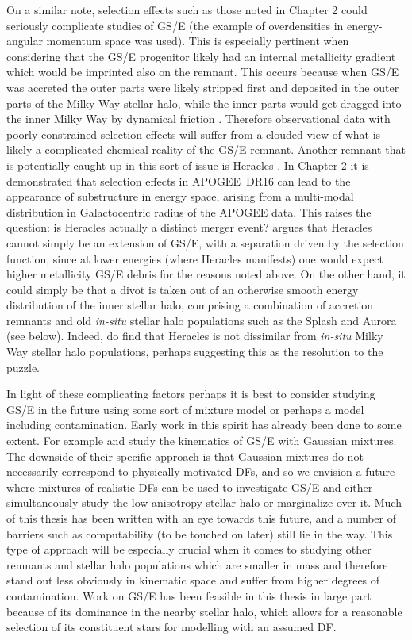 On a similar note, selection effects such as those noted in Chapter 2 could seriously complicate studies of GS/E (the example of overdensities in energy-angular momentum space was used). This is especially pertinent when considering that the GS/E progenitor likely had an internal metallicity gradient which would be imprinted also on the remnant. This occurs because when GS/E was accreted the outer parts were likely stripped first and deposited in the outer parts of the Milky Way stellar halo, while the inner parts would get dragged into the inner Milky Way by dynamical friction \parencite[e.g. see ][]{amarante22,vasiliev22}. Therefore observational data with poorly constrained selection effects will suffer from a clouded view of what is likely a complicated chemical reality of the GS/E remnant. Another remnant that is potentially caught up in this sort of issue is Heracles \parencite{horta21a}. In Chapter 2 it is demonstrated that selection effects in APOGEE~DR16 can lead to the appearance of substructure in energy space, arising from a multi-modal distribution in Galactocentric radius of the APOGEE data. This raises the question: is Heracles actually a distinct merger event? \textcite{amarante22} argues that Heracles cannot simply be an extension of GS/E, with a separation driven by the selection function, since at lower energies (where Heracles manifests) one would expect higher metallicity GS/E debris for the reasons noted above. On the other hand, it could simply be that a divot is taken out  of an otherwise smooth energy distribution of the inner stellar halo, comprising a combination of accretion remnants and old \textit{in-situ} stellar halo populations such as the Splash and Aurora (see below). Indeed, \textcite{horta23a} do find that Heracles is not dissimilar from \textit{in-situ} Milky Way stellar halo populations, perhaps suggesting this as the resolution to the puzzle.

In light of these complicating factors perhaps it is best to consider studying GS/E in the future using some sort of mixture model or perhaps a model including contamination. Early work in this spirit has already been done to some extent. For example \textcite{lancaster19} and \textcite{iorio21} study the kinematics of GS/E with Gaussian mixtures. The downside of their specific approach is that Gaussian mixtures do not necessarily correspond to physically-motivated DFs, and so we envision a future where mixtures of realistic DFs can be used to investigate GS/E and either simultaneously study the low-anisotropy stellar halo or marginalize over it. Much of this thesis has been written with an eye towards this future, and a number of barriers such as computability (to be touched on later) still lie in the way. This type of approach will be especially crucial when it comes to studying other remnants and stellar halo populations which are smaller in mass and therefore stand out less obviously in kinematic space and suffer from higher degrees of contamination. Work on GS/E has been feasible in this thesis in large part because of its dominance in the nearby stellar halo, which allows for a reasonable selection of its constituent stars for modelling with an assumed DF.



